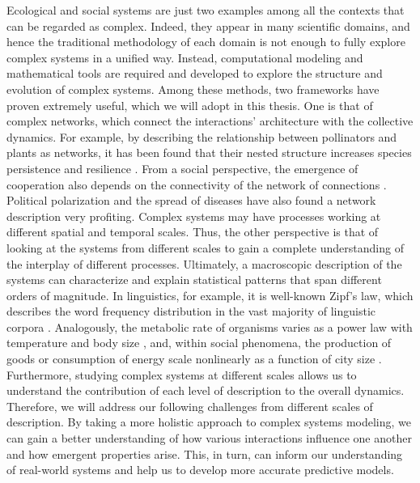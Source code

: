 Ecological and social systems are just two examples among all the contexts that can be regarded as complex. Indeed, they appear in many scientific domains, and hence the traditional methodology of each domain is not enough to fully explore complex systems in a unified way. Instead, computational modeling and mathematical tools are required and developed to explore the structure and evolution of complex systems. Among these methods, two frameworks have proven extremely useful, which we will adopt in this thesis. One is that of complex networks, which connect the interactions’ architecture with the collective dynamics. For example, by describing the relationship between pollinators and plants as networks, it has been found that their nested structure increases species persistence and resilience \cite{cota2019echo}.  From a social perspective, the emergence of cooperation also depends on the connectivity of the network of connections \cite{raducha2022coordination}. Political polarization and the spread of diseases have also found a network description very profiting. Complex systems may have processes working at different spatial and temporal scales. Thus, the other perspective is that of looking at the systems from different scales to gain a complete understanding of the interplay of different processes. Ultimately, a macroscopic description of the systems can characterize and explain statistical patterns that span different orders of magnitude. In linguistics, for example, it is well-known Zipf’s law, which describes the word frequency distribution in the vast majority of linguistic corpora  \cite{zipf1999psycho}. Analogously, the metabolic rate of organisms varies as a power law with temperature and body size \cite{brown2004toward}, and, within social phenomena, the production of goods or consumption of energy scale nonlinearly as a function of city size \cite{west2017scale}. \\

Furthermore, studying complex systems at different scales allows us to understand the contribution of each level of description to the overall dynamics. Therefore, we will address our following challenges from different scales of description. By taking a more holistic approach to complex systems modeling, we can gain a better understanding of how various interactions influence one another and how emergent properties arise. This, in turn, can inform our understanding of real-world systems and help us to develop more accurate predictive models. \\

